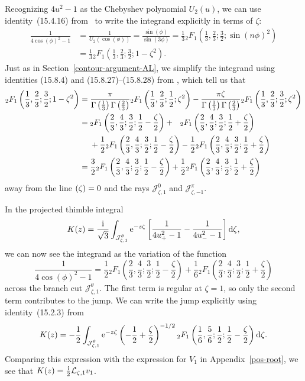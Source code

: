 \documentclass[pdftex]{sigma}
\let\Re\relax
\DeclareMathOperator{\Re}{Re}
\newcommand{\laplace}{\mathcal{L}}
\numberwithin{equation}{section}
\begin{document}
Recognizing $4u^2 - 1$ as the Chebyshev polynomial $U_2(u)$, we can use identity~(15.4.16) from~\cite{dlmf} to write the integrand explicitly in terms of $\zeta$:
\begin{align*}
\frac{1}{4 \cos(\phi)^2 - 1} & = \frac{1}{U_2(\cos(\phi))} = \frac{\sin(\phi)}{\sin(3\phi)} = \frac{1}{3} {}_2F_1\left(\frac{1}{3}, \frac{2}{3}; \frac{3}{2}; \sin(n \phi)^2\right) \\
& = \frac{1}{3} {}_2F_1\left(\frac{1}{3}, \frac{2}{3}; \frac{3}{2}; 1 - \zeta^2\right).
\end{align*}
Just as in Section~\ref{contour-argument-AL}, we simplify the integrand using identities (15.8.4) and (15.8.27)--(15.8.28) from \cite{dlmf}, which tell us that
\begin{align*}
{}_2F_1\left(\frac{1}{3}, \frac{2}{3}; \frac{3}{2}; 1 - \zeta^2\right)
 ={}&\frac{\pi}{\Gamma\left(\frac{1}{3}\right) \Gamma\left(\frac{2}{3}\right)} {}_2F_1\left(\frac{1}{3}, \frac{2}{3}; \frac{1}{2}; \zeta^2\right) - \frac{\pi \zeta}{\Gamma\left(\frac{1}{3}\right) \Gamma\left(\frac{2}{3}\right)} {}_2F_1\left(\frac{1}{3}, \frac{2}{3}; \frac{3}{2}; \zeta^2\right) \\
={}& {}_2F_1\left(\frac{2}{3}, \frac{4}{3}; \frac{3}{2}; \frac{1}{2} - \frac{\zeta}{2}\right) + \hphantom{\frac{0}{0}} {}_2F_1\left(\frac{2}{3}, \frac{4}{3}; \frac{3}{2}; \frac{1}{2} + \frac{\zeta}{2}\right) \\
& + \frac{1}{2} {}_2F_1\left(\frac{2}{3}, \frac{4}{3}; \frac{3}{2}; \frac{1}{2} - \frac{\zeta}{2}\right) - \frac{1}{2} {}_2F_1\left(\frac{2}{3}, \frac{4}{3}; \frac{3}{2}; \frac{1}{2} + \frac{\zeta}{2}\right) \\
={}&\frac{3}{2} {}_2F_1\left(\frac{2}{3}, \frac{4}{3}; \frac{3}{2};\frac{1}{2} - \frac{\zeta}{2}\right) + \frac{1}{2} {}_2F_1\left(\frac{2}{3}, \frac{4}{3}; \frac{3}{2}; \frac{1}{2} + \frac{\zeta}{2}\right)
\end{align*}
away from the line $\Re(\zeta) = 0$ and the rays $\mathcal{J}^0_{\zeta,1}$ and $\mathcal{J}^\pi_{\zeta,-1}$.

In the projected thimble integral
\[ K(z) = \frac{\rm i}{\sqrt{3}} \int_{\mathcal{J}^\theta_{\zeta, 1}} {\rm e}^{-z\zeta}\left[\frac{1}{4u_+^2 - 1} - \frac{1}{4u_-^2 - 1}\right] {\rm d}\zeta, \]
we can now see the integrand as the variation of the function
\[ \frac{1}{4\cos(\phi)^2 - 1} = \frac{1}{2} {}_2F_1\left(\frac{2}{3}, \frac{4}{3}; \frac{3}{2};\frac{1}{2} - \frac{\zeta}{2}\right) + \frac{1}{6} {}_2F_1\left(\frac{2}{3}, \frac{4}{3}; \frac{3}{2}; \frac{1}{2} + \frac{\zeta}{2}\right) \]
across the branch cut $\mathcal{J}^\theta_{\zeta,1}$. The first term is regular at $\zeta = 1$, so only the second term contributes to the jump. We can write the jump explicitly using identity~(15.2.3) from \cite{dlmf}
\[ K(z) = -\frac{1}{2} \int_{\mathcal{J}^\theta_{\zeta, 1}} {\rm e}^{-z\zeta} \left(-\frac{1}{2}+\frac{\zeta}{2}\right)^{-1/2} {}_2F_1\left(\frac{1}{6}, \frac{5}{6}; \frac{1}{2}; \frac{1}{2} - \frac{\zeta}{2}\right) {\rm d}\zeta. \]
Comparing this expression with the expression for $V_1$ in Appendix~\ref{pos-root}, we see that
$K(z) = \frac{\rm i}{2}\laplace_{\zeta, 1} v_1$.
\end{document}
